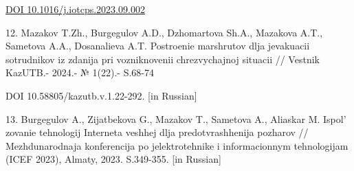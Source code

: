 \begin{references}
\href{https://doi.org/10.1016/j.iotcps.2023.09.002}{DOI
10.1016/j.iotcps.2023.09.002}

12. Mazakov T.Zh., Burgegulov A.D., Dzhomartova Sh.A., Mazakova A.T.,
Sametova A.A., Dosanalieva A.T. Postroenie marshrutov dlja jevakuacii
sotrudnikov iz zdanija pri vozniknovenii chrezvychajnoj situacii //
Vestnik KazUTB.- 2024.- № 1(22).- S.68-74

DOI 10.58805/kazutb.v.1.22-292. {[}in Russian{]}

13. Burgegulov A., Zijatbekova G., Mazakov T., Sametova A., Aliaskar M.
Ispol' zovanie tehnologij Interneta veshhej dlja
predotvrashhenija pozharov // Mezhdunarodnaja konferencija po
jelektrotehnike i informacionnym tehnologijam (ICEF 2023), Almaty, 2023.
S.349-355. {[}in Russian{]}
\end{references}

